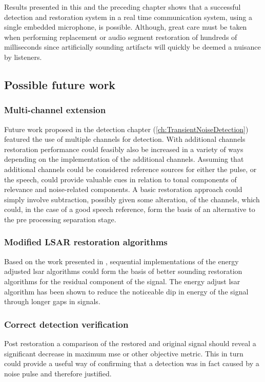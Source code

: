 Results presented in this and the preceding chapter shows that a successful detection and restoration system in a real time communication system, using a single embedded microphone, is possible. Although, great care must be taken when performing replacement or audio segment restoration of hundreds of milliseconds since artificially sounding artifacts will quickly be deemed a nuisance by listeners.

\subsection{Possible future work}
\subsubsection{Multi-channel extension}
Future work proposed in the detection chapter (\ref{ch:TransientNoiseDetection}) featured the use of multiple channels for detection. With additional channels restoration performance could feasibly also be increased in a variety of ways depending on the implementation of the additional channels. Assuming that additional channels could be considered reference sources for either the pulse, or the speech, could provide valuable cues in relation to tonal components of relevance and noise-related components. A basic restoration approach could simply involve subtraction, possibly given some alteration, of the channels, which could, in the case of a good speech reference, form the basis of an alternative to the pre processing separation stage.

\subsubsection{Modified LSAR restoration algorithms}
Based on the work presented in \cite{Esquef2006}, sequential implementations of the energy adjusted \gls{lsar} algorithms could form the basis of better sounding restoration algorithms for the residual component of the signal. The energy adjust \gls{lsar} algorithm has been shown to reduce the noticeable dip in energy of the signal through longer gaps in signals.

\subsubsection{Correct detection verification}
Post restoration a comparison of the restored and original signal should reveal a significant decrease in maximum \gls{mse} or other objective metric. This in turn could provide a useful way of confirming that a detection was in fact caused by a noise pulse and therefore justified.


